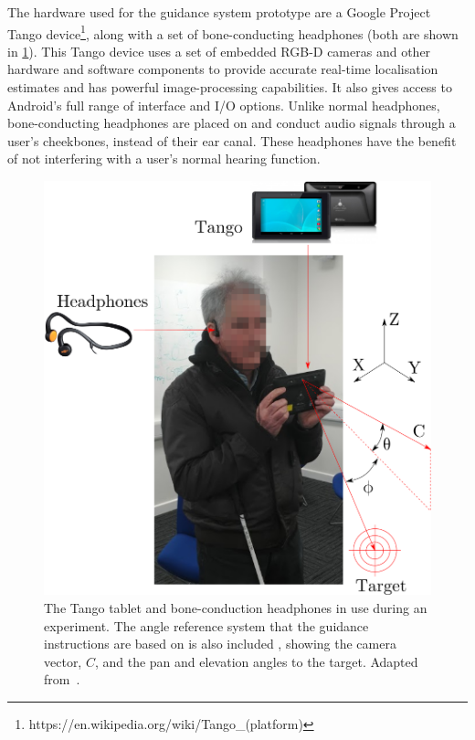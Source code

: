 \documentclass[acmsmall]{acmart}
\begin{document}
The hardware used for the guidance system prototype are a Google Project Tango device\footnote{https://en.wikipedia.org/wiki/Tango\_(platform)}, along with a set of bone-conducting headphones (both are shown in \cref{fig:participant}).
This Tango device uses a set of embedded RGB-D cameras and other hardware and software components to provide accurate real-time localisation estimates and has powerful image-processing capabilities.
It also gives access to Android's full range of interface and I/O options.
Unlike normal headphones, bone-conducting headphones are placed on and conduct audio signals through a user's cheekbones, instead of their ear canal.
These headphones have the benefit of not interfering with a user's normal hearing function.

\begin{figure}
  \centering
  \includegraphics[width=0.8\columnwidth]{figures/vi_participant_e.png}
  \caption{The Tango tablet and bone-conduction headphones in use during an experiment. The angle reference system that the guidance instructions are based on is also included , showing the camera vector, $C$, and the pan and elevation angles to the target. Adapted from~\citet{lock2019bone}.}\label{fig:participant}
\end{figure}
\end{document}
